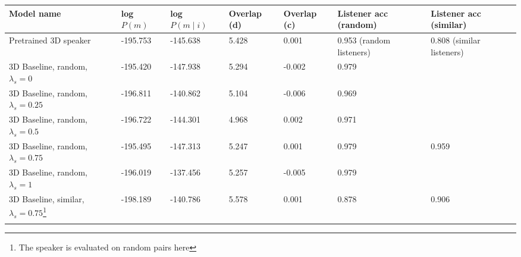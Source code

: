 \begin{table}[]
	\begin{tabularx}{\textwidth}{|X|l|l|X|X|X|X|}
		\hline
		\textbf{Model name}                                    & \textbf{log $P(m)$} & \textbf{log $P(m \mid i)$} & \textbf{Overlap (d)} & \textbf{Overlap (c)} & \textbf{Listener acc (random)} & \textbf{Listener acc (similar)} \\ \hline
		Pretrained 3D speaker                            &       -195.753            &         -145.638               &        5.428              &      0.001                & 0.953 (random listeners)                 & 0.808 (similar listeners)                 \\ \hline
		3D Baseline, random, $\lambda_s = 0$ &       -195.420            &    -147.938                    &           5.294            &      -0.002                &                 0.979                         &                                           \\ \hline
		3D Baseline, random, $\lambda_s = 0.25$     &     -196.811              &       -140.862                 &          5.104            &       -0.006               &          0.969                                &                                           \\ \hline
		3D Baseline, random, $\lambda_s = 0.5$   &         -196.722          &        -144.301                &        4.968              &          0.002            &                  0.971                      &                                           \\ \hline
		3D Baseline, random, $\lambda_s = 0.75$  &       -195.495        &           -147.313           &          5.247            &         0.001             & 0.979                                    &                        0.959                   \\ \hline
		3D Baseline, random, $\lambda_s = 1$   &      -196.019             &            -137.456             &        5.257              &          -0.005            &              0.979                            &                                           \\ \hline
		3D Baseline, similar, $\lambda_s = 0.75$\footnote{The speaker is evaluated on random pairs here} &      -198.189             &       -140.786                 &           5.578           &        0.001              & 0.878                      &            0.906                        \\ \hline
		&                   &                        &                      &                      &                                          &                                           \\ \hline

\end{tabularx}
\end{table}
